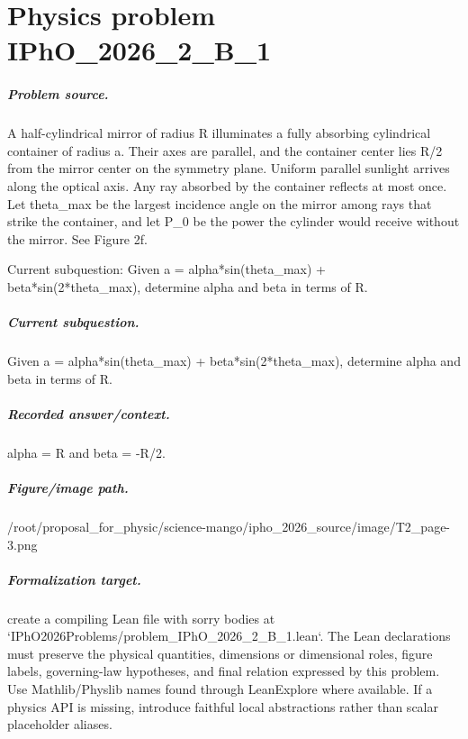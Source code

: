 
\chapter{Physics problem IPhO\_2026\_2\_B\_1}
\label{ch:IPhO2026Problems_problem_IPhO_2026_2_B_1}

\paragraph{Problem source.}
A half-cylindrical mirror of radius R illuminates a fully absorbing cylindrical
container of radius a.  Their axes are parallel, and the container center lies
R/2 from the mirror center on the symmetry plane.  Uniform parallel sunlight
arrives along the optical axis.  Any ray absorbed by the container reflects at
most once.  Let theta\_max be the largest incidence angle on the mirror among
rays that strike the container, and let P\_0 be the power the cylinder would
receive without the mirror.  See Figure 2f.

Current subquestion:
Given a = alpha*sin(theta\_max) + beta*sin(2*theta\_max), determine alpha and beta in terms of R.

\paragraph{Current subquestion.}
Given a = alpha*sin(theta\_max) + beta*sin(2*theta\_max), determine alpha and beta in terms of R.

\paragraph{Recorded answer/context.}
alpha = R and beta = -R/2.

\paragraph{Figure/image path.}
/root/proposal\_for\_physic/science-mango/ipho\_2026\_source/image/T2\_page-3.png

\paragraph{Formalization target.}
create a compiling Lean file with sorry bodies at `IPhO2026Problems/problem\_IPhO\_2026\_2\_B\_1.lean`. The Lean declarations must preserve the physical quantities, dimensions or dimensional roles, figure labels, governing-law hypotheses, and final relation expressed by this problem.
Use Mathlib/Physlib names found through LeanExplore where available. If a physics API is missing, introduce faithful local abstractions rather than scalar placeholder aliases.

